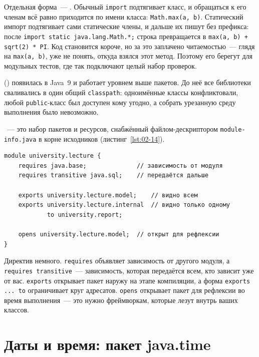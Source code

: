Отдельная форма~--- . Обычный \texttt{import}
подтягивает класс, и обращаться к его членам всё равно приходится по имени
класса: \texttt{Math.max(a, b)}. Статический импорт подтягивает сами
статические члены, и дальше их пишут без префикса: после
\texttt{import static java.lang.Math.*;} строка превращается в
\texttt{max(a, b) + sqrt(2) * PI}. Код становится короче, но за это заплачено
читаемостью~--- глядя на \texttt{max(a, b)}, уже не понять, откуда взялся этот
метод. Поэтому его берегут для модульных тестов, где так подключают целый
набор проверок.

 () появилась в
Java~9 и работает уровнем выше пакетов. До неё все библиотеки сваливались в
один общий \texttt{classpath}: одноимённые классы конфликтовали, любой
\texttt{public}-класс был доступен кому угодно, а собрать урезанную среду
выполнения было невозможно.

~--- это набор пакетов и ресурсов, снабжённый файлом-дескриптором
\texttt{module-info.java} в корне исходников (листинг~\ref{lst:02-14}).

\begin{listing}[H]
\begin{verbatim}
module university.lecture {
    requires java.base;              // зависимость от модуля
    requires transitive java.sql;    // передаётся дальше

    exports university.lecture.model;    // видно всем
    exports university.lecture.internal  // видно только одному
            to university.report;

    opens university.lecture.model;  // открыт для рефлексии
}
\end{verbatim}
\caption{Дескриптор модуля module-info.java}
\label{lst:02-14}
\end{listing}

Директив немного. \texttt{requires} объявляет зависимость от другого модуля, а
\texttt{requires transitive}~--- зависимость, которая передаётся всем, кто
зависит уже от вас. \texttt{exports} открывает пакет наружу на этапе
компиляции, а форма \texttt{exports ... to} ограничивает круг адресатов.
\texttt{opens} открывает пакет для рефлексии во время выполнения~--- это нужно
фреймворкам, которые лезут внутрь ваших классов.

\section{Даты и время: пакет java.time}

